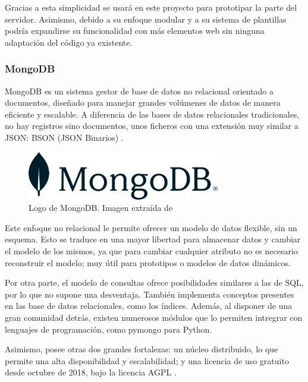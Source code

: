             Gracias a esta simplicidad se usará en este proyecto para prototipar la parte del servidor. Asimismo, debido a 
            su enfoque modular y a su sistema de plantillas podría expandirse su funcionalidad con más elementos web sin 
            ninguna adaptación del código ya existente.


        \subsubsection{MongoDB}
            MongoDB es un sistema gestor de base de datos no relacional orientado a documentos, diseñado para manejar 
            grandes volúmenes de datos de manera eficiente y escalable. A diferencia de las bases de datos relacionales 
            tradicionales, no hay registros sino documentos, unos ficheros con una extensión muy similar a JSON: BSON 
            (JSON Binarios) \cite{noauthor_json_nodate}. 

            \begin{figure}[h]
                \centering
                \includegraphics[width=0.75\textwidth]{figures/MongoDB logo.png}
                \caption[Logo de MongoDB.]
                {Logo de MongoDB. Imagen extraída de \cite{noauthor_mongodb_nodate}}
                \label{figure:mongodb:logo}
            \end{figure}


            Este enfoque no relacional le permite ofrecer un modelo de datos flexible, sin un esquema. Esto se traduce
            en una mayor libertad para almacenar datos y cambiar el modelo de los mismos, ya que para cambiar cualquier
            atributo no es necesario reconstruir el modelo; muy útil para prototipos o modelos de datos dinámicos.
            

            Por otra parte, el modelo de consultas ofrece posibilidades similares a las de SQL, por lo que no supone
            una desventaja. También implementa conceptos presentes en las base de datos relacionales, como los índices. 
            Además, al disponer de una gran comunidad detrás, existen numerosos módulos que lo permiten
            intregrar con lenguajes de programación, como pymongo para Python. 

            Asimismo, posee otras dos grandes fortalezas: un núcleo distribuido, lo que permite una alta disponibilidad
            y escalabilidad; y una licencia de uso gratuito desde octubre de 2018, bajo la licencia AGPL 
            \cite{noauthor_que_nodate}.